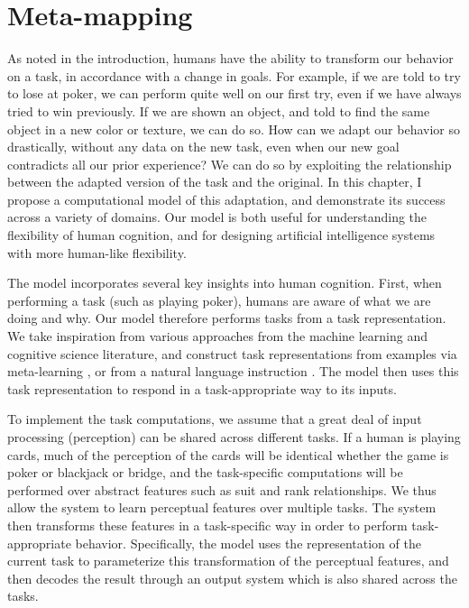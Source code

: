 \chapter{Meta-mapping} \label{chapter:zero_shot_via_homm}

As noted in the introduction, humans have the ability to transform our behavior on a task, in accordance with a change in goals. For example, if we are told to try to lose at poker, we can perform quite well on our first try, even if we have always tried to win previously. If we are shown an object, and told to find the same object in a new color or texture, we can do so. How can we adapt our behavior so drastically, without any data on the new task, even when our new goal contradicts all our prior experience? We can do so by exploiting the relationship between the adapted version of the task and the original. In this chapter, I propose a computational model of this adaptation, and demonstrate its success across a variety of domains. Our model is both useful for understanding the flexibility of human cognition, and for designing artificial intelligence systems with more human-like flexibility.   

The model incorporates several key insights into human cognition. First, when performing a task (such as playing poker), humans are aware of what we are doing and why. Our model therefore performs tasks from a task representation. We take inspiration from various approaches from the machine learning and cognitive science literature, and construct task representations from examples via meta-learning \citep[e.g.][]{Vinyals2016, Santoro2016, Finn2017a, Finn2018, Stadie2018, Botvinick2019}, or from a natural language instruction \citep{Larochelle2008, Hermann2017, Hill2019a}. The model then uses this task representation to respond in a task-appropriate way to its inputs. 

To implement the task computations, we assume that a great deal of input processing (perception) can be shared across different tasks. If a human is playing cards, much of the perception of the cards will be identical whether the game is poker or blackjack or bridge, and the task-specific computations will be performed over abstract features such as suit and rank relationships. We thus allow the system to learn perceptual features over multiple tasks. The system then transforms these features in a task-specific way in order to perform task-appropriate behavior. Specifically, the model uses the representation of the current task to parameterize this transformation of the perceptual features, and then decodes the result through an output system which is also shared across the tasks. 

